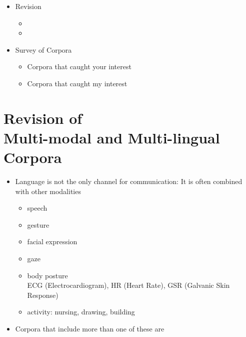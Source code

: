 \documentclass[a4paper,landscape,headrule,footrule,dvips]{foils}
\begin{document}
\begin{CJK}{UTF8}{min}

\maketitle



\begin{itemize} 
\item Revision 
  \begin{itemize}
  \item {}
  \item {}
  \end{itemize}
\item Survey of Corpora
  \begin{itemize}
  \item Corpora that caught your interest
  \item Corpora that caught my interest
  \end{itemize}
\end{itemize}



\section{Revision of \\
Multi-modal  and Multi-lingual Corpora}



\begin{itemize}
\item Language is not the only channel for communication: It is often
  combined with other modalities
  \begin{itemize}
  \item speech
  \item gesture
  \item facial expression
  \item gaze
  \item body posture
\\ ECG (Electrocardiogram), HR (Heart Rate), GSR (Galvanic Skin Response)
  \item activity: nursing, drawing, building
  \end{itemize}
\item Corpora that include more than one of these are 
\end{itemize}


\end{CJK}
\end{document}
